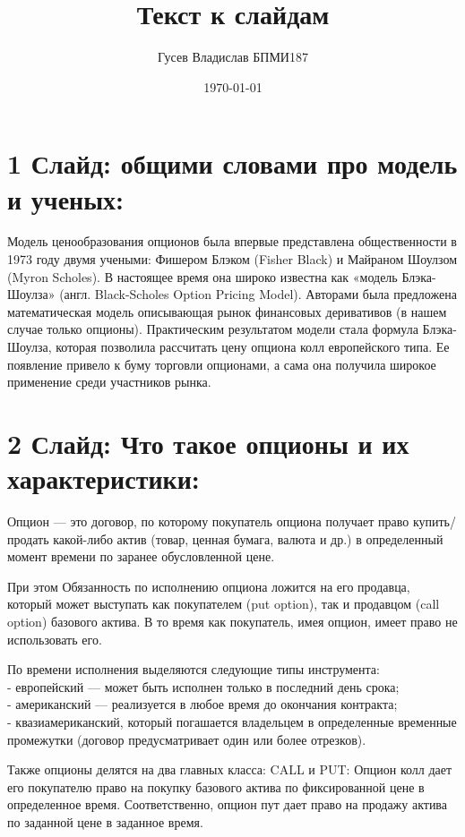 \documentclass[a4paper]{article}
\title{Текст к слайдам}
\author{Гусев Владислав БПМИ187}
\date{\today}
\begin{document}
\maketitle

\section*{1 Слайд: общими словами про модель и ученых:}
Модель ценообразования опционов была впервые представлена общественности в 1973 году двумя учеными: Фишером Блэком (Fisher Black) и Майраном Шоулзом (Myron Scholes). В настоящее время она широко известна как «модель Блэка-Шоулза» (англ. Black-Scholes Option Pricing Model). Авторами была предложена математическая модель описывающая рынок финансовых деривативов (в нашем случае только опционы). Практическим результатом модели стала формула Блэка-Шоулза, которая позволила рассчитать цену опциона колл европейского типа. Ее появление привело к буму торговли опционами, а сама она получила широкое применение среди участников рынка.

\section*{2 Слайд: Что такое опционы и их характеристики:}
Опцион — это договор, по которому покупатель опциона получает право купить/продать какой-либо актив (товар, ценная бумага, валюта и др.) в определенный момент времени по заранее обусловленной цене. 

При этом Обязанность по исполнению опциона ложится на его продавца, который может выступать как покупателем (put option), так и продавцом (call option) базового актива. В то время как покупатель, имея опцион, имеет право не использовать его.

По времени исполнения выделяются следующие типы инструмента: \\
- европейский — может быть исполнен только в последний день срока; \\
- американский — реализуется в любое время до окончания контракта; \\
- квазиамериканский, который погашается владельцем в определенные временные промежутки (договор предусматривает один или более отрезков). 

Также опционы делятся на два главных класса: CALL и PUT:
Опцион колл дает его покупателю право на покупку базового актива по фиксированной цене в определенное время. Соответственно, опцион пут дает право на продажу актива по заданной цене в заданное время.
\end{document}
